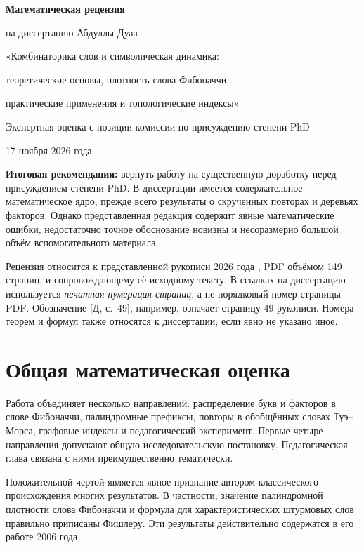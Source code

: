 \documentclass[12pt,a4paper]{article}
\newcommand{\sref}[1]{\textnormal{[Д, с.~#1]}}
\begin{document}
\thispagestyle{plain}
\begin{center}
  {\LARGE\bfseries Математическая рецензия\par}
  \vspace{8pt}
  {\large на диссертацию Абдуллы Дуаа\par}
  \vspace{5pt}
  {\large «Комбинаторика слов и символическая динамика:\par
  теоретические основы, плотность слова Фибоначчи,\par
  практические применения и топологические индексы»\par}
  \vspace{8pt}
  {Экспертная оценка с позиции комиссии по присуждению степени PhD\par}
  \vspace{4pt}
  {17 ноября 2026 года\par}
\end{center}
\vspace{4pt}

\noindent\textbf{Итоговая рекомендация:} вернуть работу на существенную
доработку перед присуждением степени PhD. В диссертации имеется
содержательное математическое ядро, прежде всего результаты о скрученных
повторах и деревьях факторов. Однако представленная редакция содержит
явные математические ошибки, недостаточно точное обоснование новизны
и несоразмерно большой объём вспомогательного материала.

Рецензия относится к представленной рукописи 2026 года
\cite{dissertation}, PDF объёмом 149 страниц, и сопровождающему её
исходному тексту. В ссылках на диссертацию используется
\emph{печатная нумерация страниц}, а не порядковый номер страницы PDF.
Обозначение \sref{49}, например, означает страницу 49 рукописи.
Номера теорем и формул также относятся к диссертации, если явно
не указано иное.

\section{Общая математическая оценка}

Работа объединяет несколько направлений: распределение букв и факторов
в слове Фибоначчи, палиндромные префиксы, повторы в обобщённых словах
Туэ--Морса, графовые индексы и педагогический эксперимент. Первые четыре
направления допускают общую исследовательскую постановку. Педагогическая
глава связана с ними преимущественно тематически.

Положительной чертой является явное признание автором классического
происхождения многих результатов. В частности, значение палиндромной
плотности слова Фибоначчи и формула для характеристических штурмовых слов
правильно приписаны Фишлеру. Эти результаты действительно содержатся
в его работе 2006 года \cite{fischler}.
\end{document}
